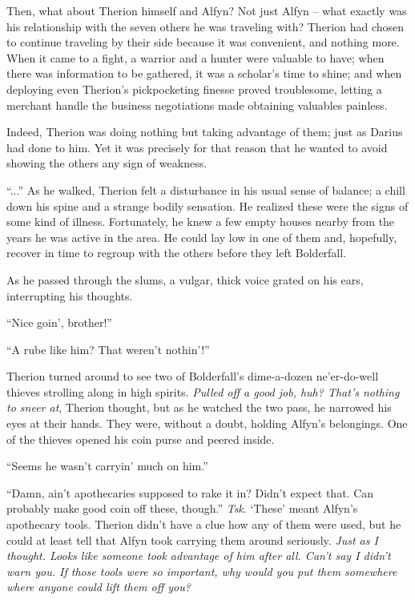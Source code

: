 Then, what about Therion himself and Alfyn? Not just Alfyn -- what exactly was his relationship with the seven others he was traveling with? Therion had chosen to continue traveling by their side because it was convenient, and nothing more. When it came to a fight, a warrior and a hunter were valuable to have; when there was information to be gathered, it was a scholar's time to shine; and when deploying even Therion's pickpocketing finesse proved troublesome, letting a merchant handle the business negotiations made obtaining valuables painless. 

Indeed, Therion was doing nothing but taking advantage of them; just as Darius had done to him. Yet it was precisely for that reason that he wanted to avoid showing the others any sign of weakness.

``...'' As he walked, Therion felt a disturbance in his usual sense of balance; a chill down his spine and a strange bodily sensation. He realized these were the signs of some kind of illness. Fortunately, he knew a few empty houses nearby from the years he was active in the area. He could lay low in one of them and, hopefully, recover in time to regroup with the others before they left Bolderfall.

As he passed through the slums, a vulgar, thick voice grated on his ears, interrupting his thoughts. 

``Nice goin', brother!''

``A rube like him? That weren't nothin'!'' 

Therion turned around to see two of Bolderfall's dime-a-dozen ne'er-do-well thieves strolling along in high spirits. \emph{Pulled off a good job, huh? That's nothing to sneer at}, Therion thought, but as he watched the two pass, he narrowed his eyes at their hands. They were, without a doubt, holding Alfyn's belongings. One of the thieves opened his coin purse and peered inside.

``Seems he wasn't carryin' much on him.''

``Damn, ain't apothecaries supposed to rake it in? Didn't expect that. Can probably make good coin off these, though.'' \emph{Tsk}. `These' meant Alfyn's apothecary tools. Therion didn't have a clue how any of them were used, but he could at least tell that Alfyn took carrying them around seriously. \emph{Just as I thought. Looks like someone took advantage of him after all. Can't say I didn't warn you. If those tools were so important, why would you put them somewhere where anyone could lift them off you?}

